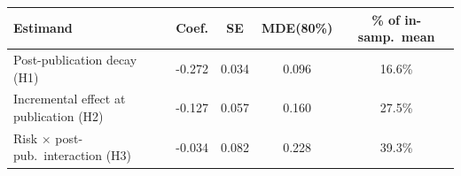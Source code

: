 \begin{tabular}{lcccc}
\toprule
Estimand & Coef. & SE & MDE(80\%) & \% of in-samp.\ mean \\
\midrule
Post-publication decay (H1) & -0.272 & 0.034 & 0.096 & 16.6\% \\
Incremental effect at publication (H2) & -0.127 & 0.057 & 0.160 & 27.5\% \\
Risk $\times$ post-pub.\ interaction (H3) & -0.034 & 0.082 & 0.228 & 39.3\% \\
\bottomrule
\end{tabular}